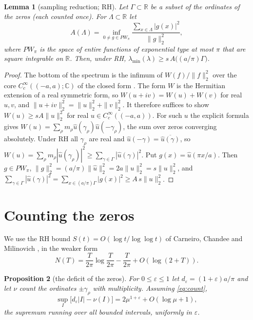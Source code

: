 \documentclass[11pt]{amsart}
\newtheorem{proposition}{Proposition}[section]
\newtheorem{lemma}[proposition]{Lemma}
\theoremstyle{definition}
\theoremstyle{remark}
\numberwithin{equation}{section}
\newcommand{\R}{\mathbb{R}}
\begin{document}
\begin{lemma}[sampling reduction; RH]\label{lem:reduction}
Let $\Gamma\subset\R$ be a subset of the ordinates of the zeros (each counted once). For $\Lambda\subset\R$ let
\[
A(\Lambda)=\inf_{0\ne g\in PW_\pi}\frac{\sum_{x\in\Lambda}|g(x)|^2}{\|g\|_2^2},
\]
where $PW_\pi$ is the space of entire functions of exponential type at most $\pi$ that are square integrable on $\R$. Then, under RH, $\lambda_{\min}(\lambda)\ge s\,A\bigl((a/\pi)\Gamma\bigr)$.
\end{lemma}
\begin{proof}
The bottom of the spectrum is the infimum of $W(f)/\|f\|_2^2$ over the core $C_c^\infty((-a,a);\mathbb C)$ of the closed form \cite{CCM25}. The form $W$ is the Hermitian extension of a real symmetric form, so $W(u+iv)=W(u)+W(v)$ for real $u,v$, and $\|u+iv\|_2^2=\|u\|_2^2+\|v\|_2^2$. It therefore suffices to show $W(u)\ge sA\|u\|_2^2$ for real $u\in C_c^\infty((-a,a))$. For such $u$ the explicit formula \cite[Lemma~3.2]{MoriWWUB} gives $W(u)=\sum_\rho m_\rho\hat u(\gamma_\rho)\hat u(-\gamma_\rho)$, the sum over zeros converging absolutely. Under RH all $\gamma_\rho$ are real and $\hat u(-\gamma)=\overline{\hat u(\gamma)}$, so $W(u)=\sum_\rho m_\rho|\hat u(\gamma_\rho)|^2\ge\sum_{\gamma\in\Gamma}|\hat u(\gamma)|^2$. Put $g(x)=\hat u(\pi x/a)$. Then $g\in PW_\pi$, $\|g\|_2^2=(a/\pi)\|\hat u\|_2^2=2a\|u\|_2^2=s\|u\|_2^2$, and $\sum_{\gamma\in\Gamma}|\hat u(\gamma)|^2=\sum_{x\in(a/\pi)\Gamma}|g(x)|^2\ge A\,s\|u\|_2^2$.
\end{proof}

\section{Counting the zeros}\label{sec:count}

We use the RH bound $S(t)=O(\log t/\log\log t)$ of Carneiro, Chandee and Milinovich \cite{CCM13}, in the weaker form
\begin{equation}\label{eq:count}
N(T)=\frac T{2\pi}\log\frac T{2\pi}-\frac T{2\pi}+O(\log(2+T)).
\end{equation}

\begin{proposition}[the deficit of the zeros]\label{prop:N}
For $0\le\varepsilon\le1$ let $d_\varepsilon=(1+\varepsilon)a/\pi$ and let $\nu$ count the ordinates $\pm\gamma_\rho$ with multiplicity. Assuming \eqref{eq:count},
\[
\sup_{I}\bigl[d_\varepsilon|I|-\nu(I)\bigr]=2\mu^{1+\varepsilon}+O(\log\mu+1),
\]
the supremum running over all bounded intervals, uniformly in $\varepsilon$.
\end{proposition}
\end{document}
